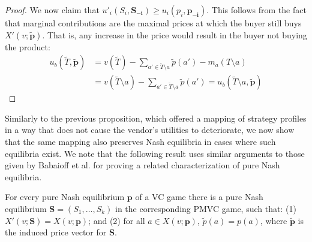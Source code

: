 \begin{proof}
We now claim that $u'_i(S_i,\mathbf{S_{-i}}) \geq u_i(p_i,\mathbf{p_{-i}})$. This follows from the fact that marginal contributions are the maximal prices at which the buyer still buys $X'(v;\mathbf{\tilde p})$. That is, any increase in the price would result in the buyer not buying the product: %
\small
\begin{align*}
 u_b(\tilde T, \mathbf{\tilde p}) 
&= v(\tilde T) - \sum_{a' \in \tilde T \setminus a}\tilde p(a') - m_a( T \setminus a)\\
&= v(\tilde T \setminus a ) - \sum_{a' \in \tilde T \setminus a}\tilde p(a') = u_b(\tilde T \setminus a, \mathbf{\tilde p})
\end{align*}
\normalsize
\end{proof}
Similarly to the previous proposition, which offered a mapping of strategy profiles in a way that does not cause the vendor's utilities to deteriorate, we now show that the same mapping also preserves Nash equilibria in cases where such equilibria exist. We note that the following result uses similar arguments to those given by Babaioff et al. for proving a related characterization of pure Nash equilibria.
\begin{theorem}
\label{thm:NE}
For every pure Nash equilibrium $\mathbf{p}$ of a VC game there is a pure Nash equilibrium $\mathbf{S}=(S_1,\ldots,S_k)$ in the corresponding PMVC game, such that: (1) $X'(v;\mathbf{S})=X(v;\mathbf{p})$; and (2) for all $a \in X(v;\mathbf{p})$, $\tilde p(a)=p(a)$, where $\mathbf{\tilde p}$ is the induced price vector for $\mathbf{S}$. %
\end{theorem}
